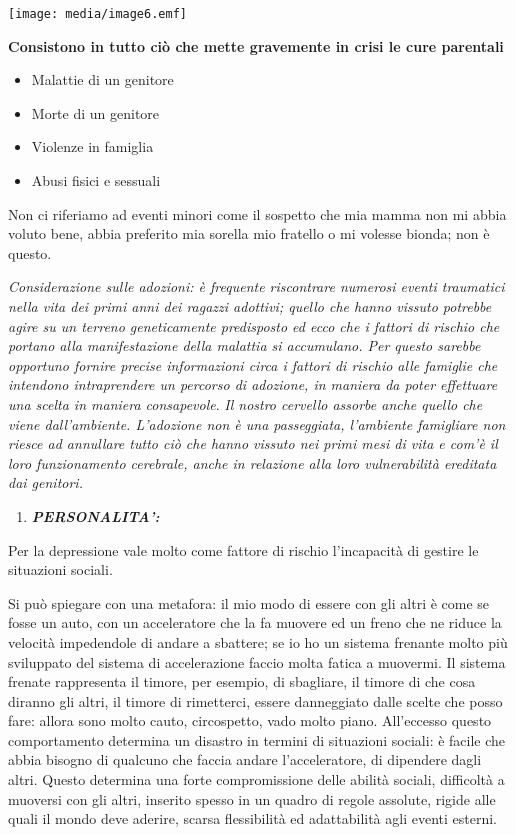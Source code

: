 \documentclass[]{article}
\begin{document}
\texttt{[image: media/image6.emf]}

\textbf{Consistono in tutto ciò che mette gravemente in crisi le cure
parentali}

\begin{itemize}
\item
  Malattie di un genitore
\item
  Morte di un genitore
\item
  Violenze in famiglia
\item
  Abusi fisici e sessuali
\end{itemize}

Non ci riferiamo ad eventi minori come il sospetto che mia mamma non mi
abbia voluto bene, abbia preferito mia sorella mio fratello o mi volesse
bionda; non è questo.

\emph{Considerazione sulle adozioni: è frequente riscontrare numerosi
eventi traumatici nella vita dei primi anni dei ragazzi adottivi; quello
che hanno vissuto potrebbe agire su un terreno geneticamente predisposto
ed ecco che i fattori di rischio che portano alla manifestazione della
malattia si accumulano. Per questo sarebbe opportuno fornire precise
informazioni circa i fattori di rischio alle famiglie che intendono
intraprendere un percorso di adozione, in maniera da poter effettuare
una scelta in maniera consapevole}. \emph{Il nostro cervello assorbe
anche quello che viene dall'ambiente. L'adozione non è una passeggiata,
l'ambiente famigliare non riesce ad annullare tutto ciò che hanno
vissuto nei primi mesi di vita e com'è il loro funzionamento cerebrale,
anche in relazione alla loro vulnerabilità ereditata dai genitori.}

\begin{enumerate}
\def\labelenumi{\arabic{enumi}.}
\item
  \textbf{\emph{PERSONALITA':}}
\end{enumerate}

Per la depressione vale molto come fattore di rischio l'incapacità di
gestire le situazioni sociali.

Si può spiegare con una metafora: il mio modo di essere con gli altri è
come se fosse un auto, con un acceleratore che la fa muovere ed un freno
che ne riduce la velocità impedendole di andare a sbattere; se io ho un
sistema frenante molto più sviluppato del sistema di accelerazione
faccio molta fatica a muovermi. Il sistema frenate rappresenta il
timore, per esempio, di sbagliare, il timore di che cosa diranno gli
altri, il timore di rimetterci, essere danneggiato dalle scelte che
posso fare: allora sono molto cauto, circospetto, vado molto piano.
All'eccesso questo comportamento determina un disastro in termini di
situazioni sociali: è facile che abbia bisogno di qualcuno che faccia
andare l'acceleratore, di dipendere dagli altri. Questo determina una
forte compromissione delle abilità sociali, difficoltà a muoversi con
gli altri, inserito spesso in un quadro di regole assolute, rigide alle
quali il mondo deve aderire, scarsa flessibilità ed adattabilità agli
eventi esterni.
\end{document}
